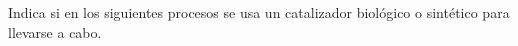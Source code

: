 Indica si en los siguientes procesos se usa un catalizador biológico o sintético para llevarse a cabo.
\begin{parts}
    
    
    \newpage
    
    
    
    
\end{parts}
